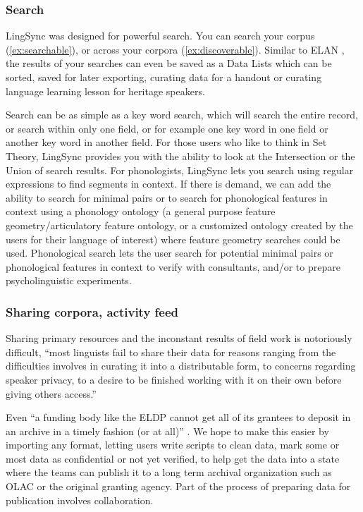 \documentclass[letterpaper, 12pt, dvips]{mitwpl}
\begin{document}
\subsubsection{Search}

LingSync was designed for powerful search.
You can search your corpus (\ref{ex:searchable}),
or across your corpora (\ref{ex:discoverable}).
Similar to ELAN \citep{Wittenburg:2006}, 
the results of your searches can even be saved as a Data Lists which can be sorted,
saved for later exporting, curating data for a handout or curating language learning lesson for heritage speakers.

Search can be as simple as a key word search,
which will search the entire record,
or search within only one field,
or for example one key word in one field or another key word in another field.
For those users who like to think in Set Theory, LingSync provides you with the ability to look at the Intersection or the Union of search results. 
For phonologists, LingSync lets you search using regular expressions to find segments in context.
If there is demand, we can add the ability to search for minimal pairs or to search for phonological features in context using a phonology ontology (a general purpose feature geometry/articulatory feature ontology,
or a customized ontology created by the users for their language of interest)  where feature geometry searches could be used.
Phonological search lets the user search for potential minimal pairs or phonological features in context to verify with consultants,
and/or to prepare psycholinguistic experiments.


\subsubsection{Sharing corpora,
activity feed}
\label{sec:sharingactivityfeeds}

Sharing primary resources and the inconstant results of field work is notoriously difficult, 
``most linguists fail to share their data for reasons ranging from the difficulties involves in curating it into a distributable form, to concerns regarding speaker privacy, to a desire to be finished working with it on their own before giving others access.'' \citep{Bender:2010} 

Even ``a funding body like the ELDP cannot get all of its grantees to deposit in an archive in a timely fashion (or at all)'' \citep{Thieberger:2012}. We hope to make this easier by importing any format, letting users write scripts to clean data, mark some or most data as confidential or not yet verified, to help get the data into a state where the teams can publish it to a long term archival organization such as OLAC or the original granting agency. Part of the process of preparing data for publication involves collaboration.
\end{document}
